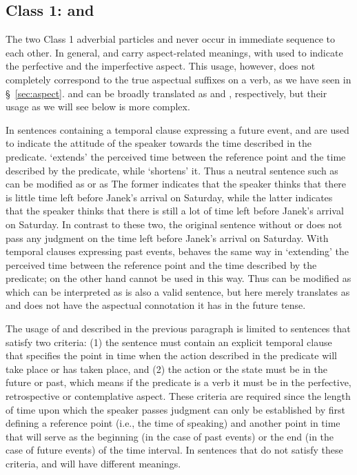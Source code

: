 \subsection{Class 1:  and }
\label{sec:class1-particles}

The two Class 1 adverbial particles  and  never occur in
immediate sequence to each other. In general,  and  carry
aspect-related meanings, with  used to indicate the perfective and
 the imperfective aspect. This usage, however, does not completely
correspond to the true aspectual suffixes on a verb, as we have seen in
\S~\ref{sec:aspect}.  and  can be broadly translated as
 and , respectively, but their usage as we will
see below is more complex.

In sentences containing a temporal clause expressing a future event, 
and  are used to indicate the attitude of the speaker towards the time
described in the predicate.  `extends' the perceived time between the
reference point and the time described by the predicate, while 
`shortens' it. Thus a neutral sentence such as  can be modified as  or as  The former indicates that the
speaker thinks that there is little time left before Janek's arrival on
Saturday, while the latter indicates that the speaker thinks that there is still
a lot of time left before Janek's arrival on Saturday. In contrast to these two,
the original sentence without  or  does not pass any judgment on
the time left before Janek's arrival on Saturday. With temporal clauses
expressing past events,  behaves the same way in `extending' the
perceived time between the reference point and the time described by the
predicate;  on the other hand cannot be used in this way. Thus
 can be modified as
 which can be interpreted as   is also a valid sentence, but here  merely translates as
 and does not have the aspectual connotation it has in the future
tense.

The usage of  and  described in the previous paragraph is
limited to sentences that satisfy two criteria: (1) the sentence must contain an
explicit temporal clause that specifies the point in time when the action
described in the predicate will take place or has taken place, and (2) the
action or the state must be in the future or past, which means if the predicate
is a verb it must be in the perfective, retrospective or contemplative aspect.
These criteria are required since the length of time upon which the speaker
passes judgment can only be established by first defining a reference point
(i.e., the time of speaking) and another point in time that will serve as the
beginning (in the case of past events) or the end (in the case of future events)
of the time interval. In sentences that do not satisfy these criteria, 
and  will have different meanings.

